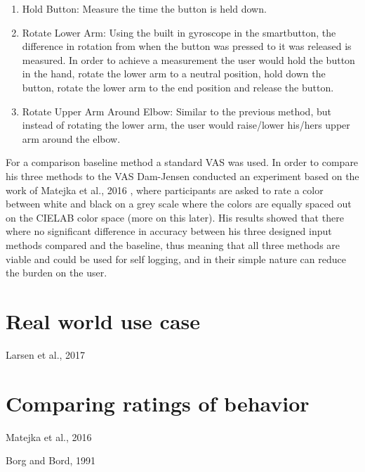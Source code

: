 \begin{enumerate}
	\item Hold Button: Measure the time the button is held down.
	\item Rotate Lower Arm: Using the built in gyroscope in the smartbutton, the difference in rotation from when the button was pressed to it was released is measured. In order to achieve a measurement the user would hold the button in the hand, rotate the lower arm to a neutral position, hold down the button, rotate the lower arm to the end position and release the button. 
	\item Rotate Upper Arm Around Elbow: Similar to the previous method, but instead of rotating the lower arm, the user would raise/lower his/hers upper arm around the elbow.
\end{enumerate}

For a comparison baseline method a standard VAS was used. In order to compare his three methods to the VAS Dam-Jensen conducted an experiment based on the work of Matejka et al., 2016 \cite{grey}, where participants are asked to rate a color between white and black on a grey scale where the colors are equally spaced out on the CIELAB color space\cite{cielab} (more on this later). His results showed that there where no significant difference in accuracy between his three designed input methods compared and the baseline, thus meaning that all three methods are viable and could be used for self logging, and in their simple nature can reduce the burden on the user.

\section{Real world use case}

Larsen et al., 2017\cite{eg}



\section{Comparing ratings of behavior}
Matejka et al., 2016 \cite{grey}

Borg and Bord, 1991\cite{borg}